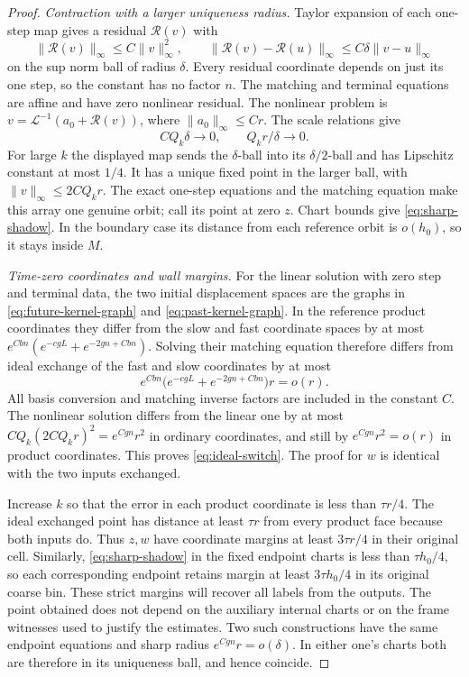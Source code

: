 \begin{proof}
\emph{Contraction with a larger uniqueness radius.}
Taylor expansion of each one-step map gives a residual
$\mathcal R(v)$ with
\begin{equation}\label{eq:one-step-remainder}
 \|\mathcal R(v)\|_\infty\le C\|v\|_\infty^2,
 \qquad
 \|\mathcal R(v)-\mathcal R(u)\|_\infty
       \le C\delta\|v-u\|_\infty
\end{equation}
on the sup norm ball of radius $\delta$.  Every residual coordinate
depends on just its one step, so the constant has no factor $n$.
The matching and terminal equations are affine and have zero nonlinear
residual.  The nonlinear problem is
$v=\mathcal L^{-1}(a_0+\mathcal R(v))$, where
$\|a_0\|_\infty\le Cr$.
The scale relations give
\[
 CQ_k\delta\longrightarrow0,\qquad Q_kr/\delta\longrightarrow0.
\]
For large $k$ the displayed map sends the $\delta$-ball into its
$\delta/2$-ball and has Lipschitz constant at most $1/4$.
It has a unique fixed point in the larger ball, with
$\|v\|_\infty\le 2CQ_kr$.  The exact one-step equations and the
matching equation make this array one genuine orbit; call its point
at zero $z$.  Chart bounds give \eqref{eq:sharp-shadow}.
In the boundary case its distance from each reference orbit is
$o(h_0)$, so it stays inside $M$.

\emph{Time-zero coordinates and wall margins.}
For the linear solution with zero step and terminal data, the two
initial displacement spaces are the graphs in
\eqref{eq:future-kernel-graph} and \eqref{eq:past-kernel-graph}.
In the reference product coordinates they differ from the slow and
fast coordinate spaces by at most
$e^{Cbn}(e^{-cgL}+e^{-2gn+Cbn})$.  Solving their matching equation
therefore differs from ideal exchange of the fast and slow coordinates
by at most
\begin{equation}\label{eq:linear-switch-error}
 e^{Cbn}\bigl(e^{-cgL}+e^{-2gn+Cbn}\bigr)r=o(r).
\end{equation}
All basis conversion and matching inverse factors are included in the
constant $C$.  The nonlinear solution differs from the linear one by
at most $CQ_k(2CQ_kr)^2=e^{Cgn}r^2$ in ordinary coordinates, and still
by $e^{Cgn}r^2=o(r)$ in product coordinates.  This proves
\eqref{eq:ideal-switch}.  The proof for $w$ is identical with the
two inputs exchanged.

Increase $k$ so that the error in each product coordinate is less than
$\tau r/4$.  The ideal exchanged point has distance at least $\tau r$
from every product face because both inputs do.  Thus $z,w$ have
coordinate margins at least $3\tau r/4$ in their original cell.
Similarly, \eqref{eq:sharp-shadow} in the fixed endpoint charts is
less than $\tau h_0/4$, so each corresponding endpoint retains margin
at least $3\tau h_0/4$ in its original coarse bin.  These strict
margins will recover all labels from the outputs.
The point obtained does not depend on the auxiliary internal charts or
on the frame witnesses used to justify the estimates.  Two such
constructions have the same endpoint equations and sharp radius
$e^{Cgn}r=o(\delta)$.  In either one's charts both are therefore in
its uniqueness ball, and hence coincide.
\end{proof}

